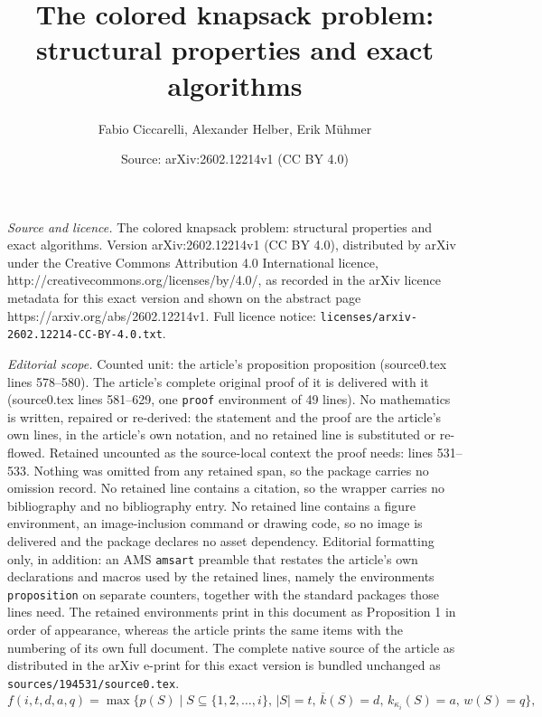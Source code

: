 \documentclass[10pt,a4paper]{amsart}
\title{The colored knapsack problem: structural properties and exact algorithms}
\author{Fabio Ciccarelli, Alexander Helber, Erik M\"uhmer}
\date{Source: arXiv:2602.12214v1 (CC BY 4.0)}
\newcommand{\profit}{p}
\newcommand{\weight}{w}
\begin{document}
\maketitle

\noindent\emph{Source and licence.} The colored knapsack problem: structural properties and exact algorithms. Version arXiv:2602.12214v1 (CC BY 4.0), distributed by arXiv under the Creative Commons Attribution 4.0 International licence, http://creativecommons.org/licenses/by/4.0/, as recorded in the arXiv licence metadata for this exact version and shown on the abstract page https://arxiv.org/abs/2602.12214v1. Full licence notice: \texttt{licenses/arxiv-2602.12214-CC-BY-4.0.txt}.\par\smallskip

\noindent\textit{Editorial scope.} Counted unit: the article's proposition proposition (source0.tex lines 578--580). The article's complete original proof of it is delivered with it (source0.tex lines 581--629, one \texttt{proof} environment of 49 lines). No mathematics is written, repaired or re-derived: the statement and the proof are the article's own lines, in the article's own notation, and no retained line is substituted or re-flowed.  Retained uncounted as the source-local context the proof needs: lines 531--533.  Nothing was omitted from any retained span, so the package carries no omission record.  No retained line contains a citation, so the wrapper carries no bibliography and no bibliography entry.  No retained line contains a figure environment, an image-inclusion command or drawing code, so no image is delivered and the package declares no asset dependency.  Editorial formatting only, in addition: an AMS \texttt{amsart} preamble that restates the article's own declarations and macros used by the retained lines, namely the environments \texttt{proposition} on separate counters, together with the standard packages those lines need.  The retained environments print in this document as Proposition 1 in order of appearance, whereas the article prints the same items with the numbering of its own full document.  The complete native source of the article as distributed in the arXiv e-print for this exact version is bundled unchanged as \texttt{sources/194531/source0.tex}.
\begin{equation}
    f(i,t,d,a,q) = \max\bigg\{\profit(S) \mid S \subseteq \{1,2,\dots, i\}, \, |S| = t, \, \overline{k}(S) = d, \, k_{\kappa_i}(S) = a, \, \weight(S) = q\bigg\}, \label{dp1:goal}
\end{equation}
\end{document}
